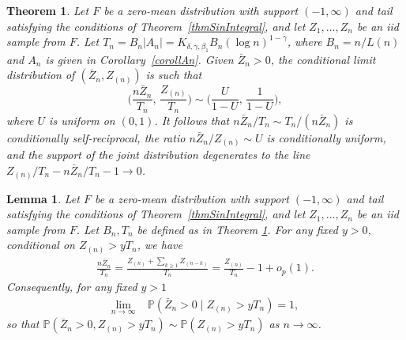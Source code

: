 \documentclass[10pt,a4paper]{amsart}
\newtheorem{theorem}{Theorem}
\newtheorem{lemma}{Lemma}
\def\Prob{{\mathbb P}}
\def\Zmax{Z_{(n)}}
\begin{document}
\begin{theorem}\label{cjl_theorem}
	Let $F$ be a zero-mean distribution with support $(-1, \infty)$ and tail satisfying the conditions of Theorem~\ref{thmSinIntegral}, and let $Z_1,\ldots, Z_n$ be an iid sample from $F$. Let $T_n = B_n|A_n| = K_{\delta,\gamma,\beta_1} B_n (\log n)^{1-\gamma}$, where $B_n=n/L(n)$ and $A_n$ is given in Corollary~\ref{corollAn}.
	Given $\bar Z_n > 0$, the conditional limit distribution of $(\bar Z_n, \Zmax)$ is such that
	\[
	\biggl(\frac{n\bar Z_n} {T_n},\, \frac{\Zmax} {T_n} \biggr) \sim \biggl(\frac U{1-U},\, \frac 1 {1-U} \biggr),
	\]
	where $U$ is uniform on $(0, 1)$.
	It follows that $n\bar Z_n/T_n \sim T_n / (n\bar Z_n)$ is conditionally self-reciprocal,
	the ratio $n\bar Z_n / \Zmax \sim U$ is conditionally uniform, 
	and the support of the joint distribution degenerates to the line $\Zmax/T_n - n\bar Z_n/T_n -1  \to 0$.
\end{theorem}

\begin{lemma}
	\label{lem:sum-max-dependence}
	Let $F$ be a zero-mean distribution with support $(-1, \infty)$ and tail satisfying the conditions of Theorem~\ref{thmSinIntegral}, and let $Z_1,\ldots, Z_n$ be an iid sample from $F$. Let $B_n,T_n$ be defined as in Theorem \ref{cjl_theorem}. For any fixed $y>0$, conditional on $Z_{(n)}>y T_n$, we have
	\begin{align}
	\label{eq:sum-max-dependence}
	\frac{n\bar{Z}_{n}}{T_n} = \frac{Z_{(n)}+\sum_{k\geq 1}Z_{(n-k)}}{T_n} = \frac{Z_{(n)}}{T_n}-1+o_p(1).
	\end{align}
	Consequently, for any fixed $y>1$
	\begin{align*}
	\lim_{n\to\infty} \; &\Prob\left( \bar{Z}_n>0 \mid Z_{(n)}>yT_n \right) = 1,
	\end{align*}
	so that $\Prob(\bar{Z}_n>0, Z_{(n)}>yT_n) \sim \Prob(Z_{(n)}>yT_n)$ as $n\to\infty$.
\end{lemma}
\end{document}
